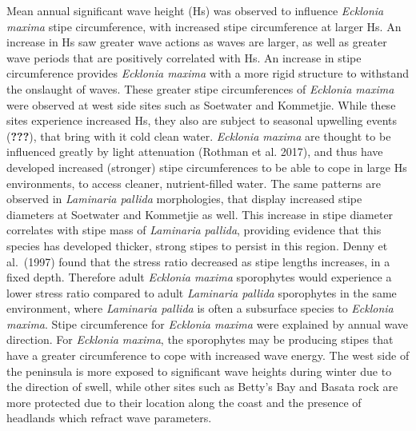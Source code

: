 \documentclass[10pt,a4,]{article}
\begin{document}
Mean annual significant wave height (Hs) was observed to influence
\emph{Ecklonia maxima} stipe circumference, with increased stipe
circumference at larger Hs. An increase in Hs saw greater wave actions
as waves are larger, as well as greater wave periods that are positively
correlated with Hs. An increase in stipe circumference provides
\emph{Ecklonia maxima} with a more rigid structure to withstand the
onslaught of waves. These greater stipe circumferences of \emph{Ecklonia
maxima} were observed at west side sites such as Soetwater and
Kommetjie. While these sites experience increased Hs, they also are
subject to seasonal upwelling events ({\textbf{???}}), that bring with
it cold clean water. \emph{Ecklonia maxima} are thought to be influenced
greatly by light attenuation (Rothman et al. 2017), and thus have
developed increased (stronger) stipe circumferences to be able to cope
in large Hs environments, to access cleaner, nutrient-filled water. The
same patterns are observed in \emph{Laminaria pallida} morphologies,
that display increased stipe diameters at Soetwater and Kommetjie as
well. This increase in stipe diameter correlates with stipe mass of
\emph{Laminaria pallida}, providing evidence that this species has
developed thicker, strong stipes to persist in this region. Denny et
al.~(1997) found that the stress ratio decreased as stipe lengths
increases, in a fixed depth. Therefore adult \emph{Ecklonia maxima}
sporophytes would experience a lower stress ratio compared to adult
\emph{Laminaria pallida} sporophytes in the same environment, where
\emph{Laminaria pallida} is often a subsurface species to \emph{Ecklonia
maxima}. Stipe circumference for \emph{Ecklonia maxima} were explained
by annual wave direction. For \emph{Ecklonia maxima}, the sporophytes
may be producing stipes that have a greater circumference to cope with
increased wave energy. The west side of the peninsula is more exposed to
significant wave heights during winter due to the direction of swell,
while other sites such as Betty's Bay and Basata rock are more protected
due to their location along the coast and the presence of headlands
which refract wave parameters.
\end{document}
